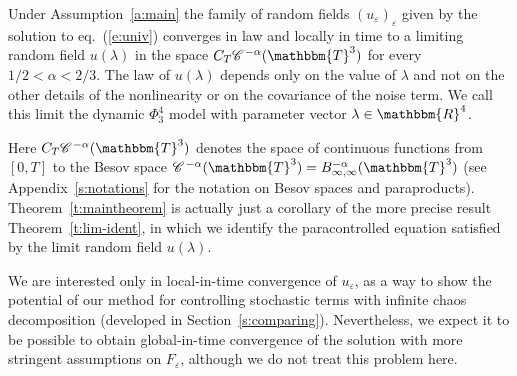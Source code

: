 \begin{theorem}
  \label{t:maintheorem}Under Assumption~\ref{a:main} the family of random
  fields $(u_{\varepsilon})_{\varepsilon}$ given by the solution to
  eq.~(\ref{e:univ}) converges in law and locally in time to a limiting random
  field $u (\lambda)$ in the space $C_T \CC^{- \alpha} (\mathbbm{T}^3)$ for
  every $1 / 2 < \alpha < 2 / 3$. The law of $u (\lambda)$ depends only on the
  value of $\lambda$ and not on the other details of the nonlinearity or on
  the covariance of the noise term. We call this limit the dynamic $\Phi^4_3$
  model with parameter vector $\lambda \in \mathbbm{R}^4$. \ 
\end{theorem}

Here $C_T \CC^{- \alpha} (\mathbbm{T}^3)$ denotes the space of continuous
functions from $[0, T]$ to the Besov space $\CC^{- \alpha} (\mathbbm{T}^3) =
B^{- \alpha}_{\infty, \infty} (\mathbbm{T}^3)$ (see Appendix~\ref{s:notations}
for the notation on Besov spaces and paraproducts).
Theorem~\ref{t:maintheorem} is actually just a corollary of the more precise
result Theorem~\ref{t:lim-ident}, in which we identify the paracontrolled
equation satisfied by the limit random field $u (\lambda)$.

\begin{remark}
  We are interested only in local-in-time convergence of $u_{\varepsilon}$, as
  a way to show the potential of our method for controlling stochastic terms
  with infinite chaos decomposition (developed in Section~\ref{s:comparing}).
  Nevertheless, we expect it to be possible to obtain global-in-time
  convergence of the solution with more stringent assumptions on
  $F_{\varepsilon}$, although we do not treat this problem here.
\end{remark}

